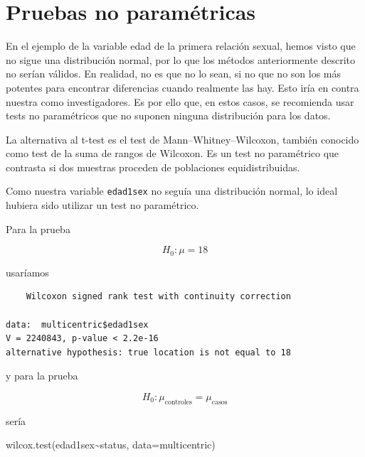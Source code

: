 \documentclass[
]{book}
\newenvironment{Shaded}{\begin{snugshade}}{\end{snugshade}}
\newcommand{\AttributeTok}[1]{\textcolor[rgb]{0.77,0.63,0.00}{#1}}
\newcommand{\DecValTok}[1]{\textcolor[rgb]{0.00,0.00,0.81}{#1}}
\newcommand{\FunctionTok}[1]{\textcolor[rgb]{0.00,0.00,0.00}{#1}}
\newcommand{\NormalTok}[1]{#1}
\newcommand{\SpecialCharTok}[1]{\textcolor[rgb]{0.00,0.00,0.00}{#1}}
\begin{document}
\hypertarget{pruebas-no-paramuxe9tricas}{%
\section{Pruebas no paramétricas}\label{pruebas-no-paramuxe9tricas}}

En el ejemplo de la variable edad de la primera relación sexual, hemos visto que no sigue una distribución normal, por lo que los métodos anteriormente descrito no serían válidos. En realidad, no es que no lo sean, si no que no son los más potentes para encontrar diferencias cuando realmente las hay. Esto iría en contra nuestra como investigadores. Es por ello que, en estos casos, se recomienda usar tests no paramétricos que no suponen ninguna distribución para los datos.

La alternativa al t-test es el test de Mann--Whitney--Wilcoxon, también conocido como test de la suma de rangos de Wilcoxon. Es un test no paramétrico que contrasta si dos muestras proceden de poblaciones equidistribuidas.

Como nuestra variable \texttt{edad1sex} no seguía una distribución normal, lo ideal hubiera sido utilizar un test no paramétrico.

Para la prueba

\[H_0: \mu =18\]

usaríamos

\begin{Shaded}
\end{Shaded}

\begin{verbatim}
    Wilcoxon signed rank test with continuity correction

data:  multicentric$edad1sex
V = 2240843, p-value < 2.2e-16
alternative hypothesis: true location is not equal to 18
\end{verbatim}

y para la prueba

\[H_0: \mu_\text{controles} =  \mu_\text{casos}\]

sería

\begin{Shaded}
\begin{Highlighting}[]
\FunctionTok{wilcox.test}\NormalTok{(edad1sex}\SpecialCharTok{\textasciitilde{}}\NormalTok{status, }\AttributeTok{data=}\NormalTok{multicentric)}
\end{Highlighting}
\end{Shaded}
\end{document}
